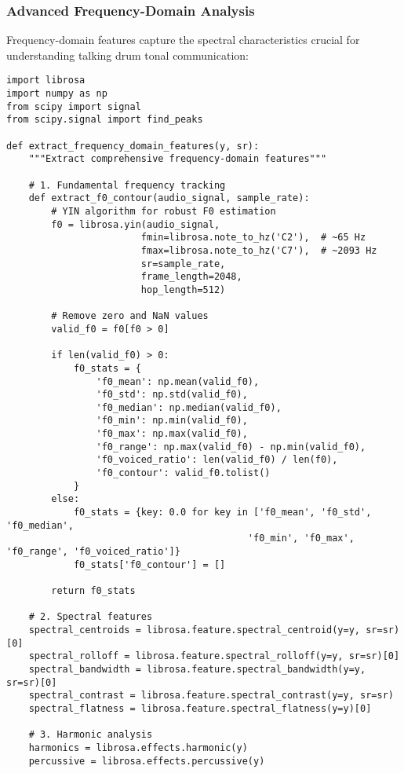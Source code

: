 \documentclass[12pt]{article}
\begin{document}
\subsubsection{Advanced Frequency-Domain Analysis}
Frequency-domain features capture the spectral characteristics crucial for understanding talking drum tonal communication:

\begin{verbatim}
import librosa
import numpy as np
from scipy import signal
from scipy.signal import find_peaks

def extract_frequency_domain_features(y, sr):
    """Extract comprehensive frequency-domain features"""
    
    # 1. Fundamental frequency tracking
    def extract_f0_contour(audio_signal, sample_rate):
        # YIN algorithm for robust F0 estimation
        f0 = librosa.yin(audio_signal, 
                        fmin=librosa.note_to_hz('C2'),  # ~65 Hz
                        fmax=librosa.note_to_hz('C7'),  # ~2093 Hz
                        sr=sample_rate,
                        frame_length=2048,
                        hop_length=512)
        
        # Remove zero and NaN values
        valid_f0 = f0[f0 > 0]
        
        if len(valid_f0) > 0:
            f0_stats = {
                'f0_mean': np.mean(valid_f0),
                'f0_std': np.std(valid_f0),
                'f0_median': np.median(valid_f0),
                'f0_min': np.min(valid_f0),
                'f0_max': np.max(valid_f0),
                'f0_range': np.max(valid_f0) - np.min(valid_f0),
                'f0_voiced_ratio': len(valid_f0) / len(f0),
                'f0_contour': valid_f0.tolist()
            }
        else:
            f0_stats = {key: 0.0 for key in ['f0_mean', 'f0_std', 'f0_median', 
                                           'f0_min', 'f0_max', 'f0_range', 'f0_voiced_ratio']}
            f0_stats['f0_contour'] = []
        
        return f0_stats
    
    # 2. Spectral features
    spectral_centroids = librosa.feature.spectral_centroid(y=y, sr=sr)[0]
    spectral_rolloff = librosa.feature.spectral_rolloff(y=y, sr=sr)[0]
    spectral_bandwidth = librosa.feature.spectral_bandwidth(y=y, sr=sr)[0]
    spectral_contrast = librosa.feature.spectral_contrast(y=y, sr=sr)
    spectral_flatness = librosa.feature.spectral_flatness(y=y)[0]
    
    # 3. Harmonic analysis
    harmonics = librosa.effects.harmonic(y)
    percussive = librosa.effects.percussive(y)
    

\end{verbatim}
\end{document}
